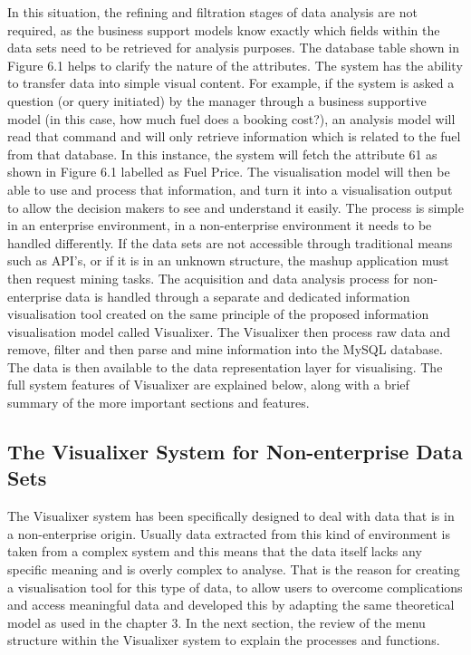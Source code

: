 In this situation, the refining and filtration stages of data analysis are not required, as the business support models know exactly which fields within the data sets need to be retrieved for analysis purposes. The database table shown in Figure 6.1 helps to clarify the nature of the attributes. The system has the ability to transfer data into simple visual content. For example, if the system is asked a question (or query initiated) by the manager through a business supportive model (in this case, how much fuel does a booking cost?), an analysis model will read that command and will only retrieve information which is related to the fuel from that database. In this instance, the system will fetch the attribute 61 as shown in Figure 6.1 labelled as Fuel Price. The visualisation model will then be able to use and process that information, and turn it into a visualisation output to allow the decision makers to see and understand it easily. The process is simple in an enterprise environment, in a non-enterprise environment it needs to be handled differently. If the data sets are not accessible through traditional means such as API's, or if it is in an unknown structure, the mashup application must then request mining tasks. The acquisition and data analysis process for non-enterprise data is handled through a separate and dedicated information visualisation tool created on the same principle of the proposed information visualisation model called Visualixer. The Visualixer then process raw data and remove, filter and then parse and mine information into the MySQL database. The data is then available to the data representation layer for visualising. The full system features of Visualixer are explained below, along with a brief summary of the more important sections and features.

\subsection{The Visualixer System for Non-enterprise Data Sets}

The Visualixer system has been specifically designed to deal with data that is in a non-enterprise origin. Usually data extracted from this kind of environment is taken from a complex system and this means that the data itself lacks any specific meaning and is overly complex to analyse. That is the reason for creating a visualisation tool for this type of data, to allow users to overcome complications and access meaningful data and developed this by adapting the same theoretical model as used in the chapter 3. In the next section, the review of the menu structure within the Visualixer system to explain the processes and functions.

